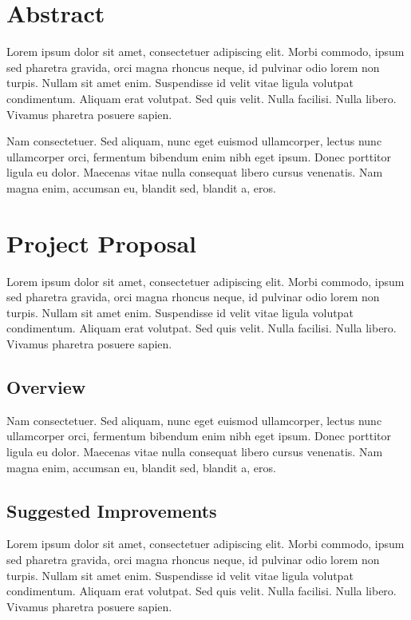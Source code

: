 \documentclass[10pt]{article}
\begin{document}
\begin{multicols}{2}

\section*{Abstract}
Lorem ipsum dolor sit amet, consectetuer adipiscing elit. Morbi commodo, ipsum sed pharetra gravida, orci magna rhoncus neque, id pulvinar odio lorem non turpis. Nullam sit amet enim. Suspendisse id velit vitae ligula volutpat condimentum. Aliquam erat volutpat. Sed quis velit. Nulla facilisi. Nulla libero. Vivamus pharetra posuere sapien. 

Nam consectetuer. Sed aliquam, nunc eget euismod ullamcorper, lectus nunc ullamcorper orci, fermentum bibendum enim nibh eget ipsum. Donec porttitor ligula eu dolor. Maecenas vitae nulla consequat libero cursus venenatis. Nam magna enim, accumsan eu, blandit sed, blandit a, eros.

\section*{Project Proposal}
Lorem ipsum dolor sit amet, consectetuer adipiscing elit. Morbi commodo, ipsum sed pharetra gravida, orci magna rhoncus neque, id pulvinar odio lorem non turpis. Nullam sit amet enim. Suspendisse id velit vitae ligula volutpat condimentum. Aliquam erat volutpat. Sed quis velit. Nulla facilisi. Nulla libero. Vivamus pharetra posuere sapien.

\subsection*{Overview}
Nam consectetuer. Sed aliquam, nunc eget euismod ullamcorper, lectus nunc ullamcorper orci, fermentum bibendum enim nibh eget ipsum. Donec porttitor ligula eu dolor. Maecenas vitae nulla consequat libero cursus venenatis. Nam magna enim, accumsan eu, blandit sed, blandit a, eros. 

\subsection*{Suggested Improvements}
Lorem ipsum dolor sit amet, consectetuer adipiscing elit. Morbi commodo, ipsum sed pharetra gravida, orci magna rhoncus neque, id pulvinar odio lorem non turpis. Nullam sit amet enim. Suspendisse id velit vitae ligula volutpat condimentum. Aliquam erat volutpat. Sed quis velit. Nulla facilisi. Nulla libero. Vivamus pharetra posuere sapien.


\end{multicols}
\end{document}
